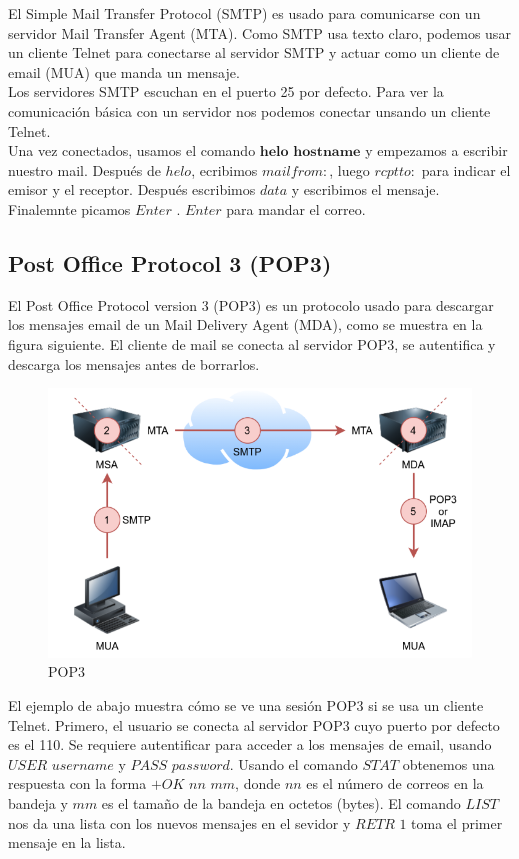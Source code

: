 \documentclass[12pt]{report}
\begin{document}
El Simple Mail Transfer Protocol (SMTP) es usado para comunicarse con un servidor 
Mail Transfer Agent (MTA). Como SMTP usa texto claro, podemos usar un cliente Telnet 
para conectarse al servidor SMTP y actuar como un cliente de email (MUA) que manda un mensaje.\\

Los servidores SMTP escuchan en el puerto 25 por defecto. Para ver la comunicación 
básica con un servidor nos podemos conectar unsando un cliente Telnet.\\
Una vez conectados, usamos el comando $\textbf{helo hostname}$ y empezamos a escribir nuestro mail.
Después de $helo$, ecribimos $mail from:$, luego $rcpt to:$ para indicar el emisor y el receptor.
Después escribimos $data$ y escribimos el mensaje. Finalemnte picamos $Enter$ $.$ $Enter$ para mandar el correo.

\subsection{Post Office Protocol 3 (POP3)}
El Post Office Protocol version 3 (POP3) es un protocolo usado para descargar 
los mensajes email de un Mail Delivery Agent (MDA), como se muestra en la figura siguiente.
El cliente de mail se conecta al servidor POP3, se autentifica y descarga los mensajes antes de borrarlos.

\begin{figure}[h]
\centering
\includegraphics[width=1\textwidth]{POP3.jpg}
\caption{POP3}
\end{figure}

El ejemplo de abajo muestra cómo se ve una sesión POP3 si se usa un cliente Telnet.
Primero, el usuario se conecta al servidor POP3 cuyo puerto por defecto es el 110.
Se requiere autentificar para acceder a los mensajes de email, usando 
$\textit{USER username}$ y $\textit{PASS password}$. Usando el comando $STAT$ obtenemos 
una respuesta con la forma $\textit{+OK nn mm}$, donde $nn$ es el número de correos 
en la bandeja y $mm$ es el tamaño de la bandeja en octetos (bytes). 
El comando $LIST$ nos da una lista con los nuevos mensajes en el sevidor y $\textit{RETR 1}$
toma el primer mensaje en la lista.
\end{document}
